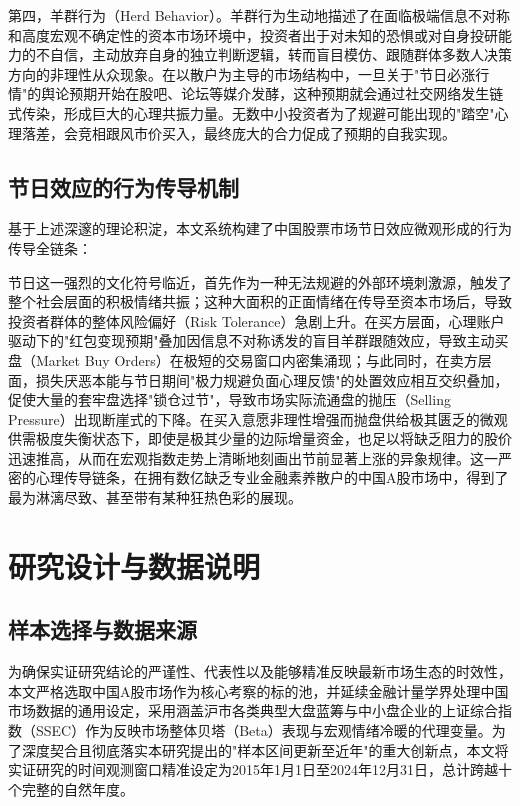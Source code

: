 \documentclass{cupb-thesis}
\begin{document}
第四，羊群行为（Herd Behavior）。羊群行为生动地描述了在面临极端信息不对称和高度宏观不确定性的资本市场环境中，投资者出于对未知的恐惧或对自身投研能力的不自信，主动放弃自身的独立判断逻辑，转而盲目模仿、跟随群体多数人决策方向的非理性从众现象。在以散户为主导的市场结构中，一旦关于"节日必涨行情"的舆论预期开始在股吧、论坛等媒介发酵，这种预期就会通过社交网络发生链式传染，形成巨大的心理共振力量。无数中小投资者为了规避可能出现的"踏空"心理落差，会竞相跟风市价买入，最终庞大的合力促成了预期的自我实现。


\section{节日效应的行为传导机制}


基于上述深邃的理论积淀，本文系统构建了中国股票市场节日效应微观形成的行为传导全链条：

节日这一强烈的文化符号临近，首先作为一种无法规避的外部环境刺激源，触发了整个社会层面的积极情绪共振；这种大面积的正面情绪在传导至资本市场后，导致投资者群体的整体风险偏好（Risk Tolerance）急剧上升。在买方层面，心理账户驱动下的"红包变现预期"叠加因信息不对称诱发的盲目羊群跟随效应，导致主动买盘（Market Buy Orders）在极短的交易窗口内密集涌现；与此同时，在卖方层面，损失厌恶本能与节日期间"极力规避负面心理反馈"的处置效应相互交织叠加，促使大量的套牢盘选择"锁仓过节"，导致市场实际流通盘的抛压（Selling Pressure）出现断崖式的下降。在买入意愿非理性增强而抛盘供给极其匮乏的微观供需极度失衡状态下，即使是极其少量的边际增量资金，也足以将缺乏阻力的股价迅速推高，从而在宏观指数走势上清晰地刻画出节前显著上涨的异象规律。这一严密的心理传导链条，在拥有数亿缺乏专业金融素养散户的中国A股市场中，得到了最为淋漓尽致、甚至带有某种狂热色彩的展现。


\chapter*{研究设计与数据说明}


\section{样本选择与数据来源}


为确保实证研究结论的严谨性、代表性以及能够精准反映最新市场生态的时效性，本文严格选取中国A股市场作为核心考察的标的池，并延续金融计量学界处理中国市场数据的通用设定，采用涵盖沪市各类典型大盘蓝筹与中小盘企业的上证综合指数（SSEC）作为反映市场整体贝塔（Beta）表现与宏观情绪冷暖的代理变量。为了深度契合且彻底落实本研究提出的"样本区间更新至近年"的重大创新点，本文将实证研究的时间观测窗口精准设定为2015年1月1日至2024年12月31日，总计跨越十个完整的自然年度。
\end{document}
